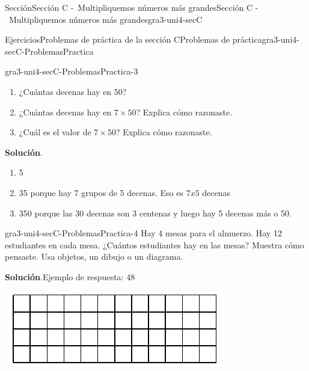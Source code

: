 \documentclass[oneside,10pt,]{article}
\newcommand{\blocktitlefont}{\relax}
\begin{document}
\begin{sectionptx}{Sección}{Sección C -~Multipliquemos números más grandes}{}{Sección C -~Multipliquemos números más grandes}{}{}{gra3-uni4-secC}
\typeout{************************************************}
%
\begin{exercises-subsection}{Ejercicios}{Problemas de práctica de la sección C}{}{Problemas de práctica}{}{}{gra3-uni4-secC-ProblemasPractica}
\begin{divisionexercise}{1}{}{}{gra3-uni4-secC-ProblemasPractica-3}%
%
\begin{enumerate}[label={(\alph*)}]
\item{}¿Cuántas decenas hay en 50?%
\item{}¿Cuántas decenas hay en \(7 \times 50\)? Explica cómo razonaste.%
\item{}¿Cuál es el valor de \(7 \times 50\)? Explica cómo razonaste.%
\end{enumerate}
\par\smallskip%
\noindent\textbf{\blocktitlefont Solución}.\hypertarget{gra3-uni4-secC-ProblemasPractica-3-2}{}\quad{}%
\begin{enumerate}[label={(\alph*)}]
\item{}5%
\item{}35 porque hay 7 grupos de 5 decenas. Eso es \(7 x 5\) decenas%
\item{}350 porque las 30 decenas son 3 centenas y luego hay 5 decenas más o 50.%
\end{enumerate}
\end{divisionexercise}%
\begin{divisionexercise}{2}{}{}{gra3-uni4-secC-ProblemasPractica-4}%
Hay 4 mesas para el almuerzo. Hay 12 estudiantes en cada mesa. ¿Cuántos estudiantes hay en las mesas? Muestra cómo pensaste. Usa objetos, un dibujo o un diagrama.%
\par\smallskip%
\noindent\textbf{\blocktitlefont Solución}.\hypertarget{gra3-uni4-secC-ProblemasPractica-4-2}{}\quad{}Ejemplo de respuesta: 48%
\begin{image}{0}{1}{0}{}%
\includegraphics[width=\linewidth]{external/svg-source/tikz-file-152441.pdf}
\end{image}%
\end{divisionexercise}%

\end{exercises-subsection}
\end{sectionptx}
\end{document}
